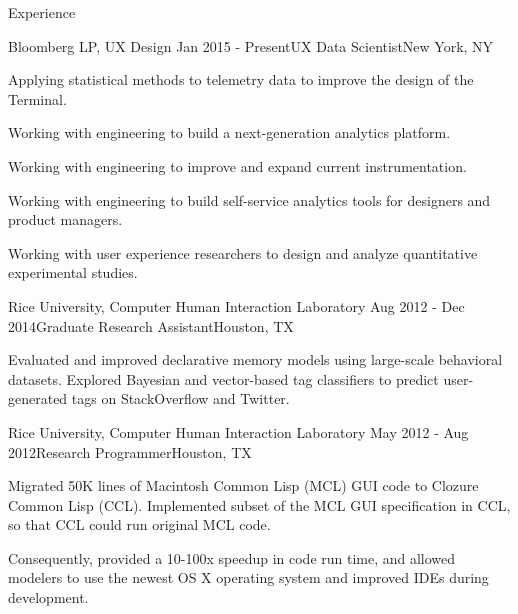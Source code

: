 
\begin{rSection}{Experience}

  \begin{rSubsection}{Bloomberg LP, UX Design}
    {Jan 2015 - Present}{UX Data Scientist}{New York, NY}
  \item Applying statistical methods to telemetry data to improve the design of the Terminal.
  \item Working with engineering to build a next-generation analytics platform.
  \item Working with engineering to improve and expand current instrumentation.
  \item Working with engineering to build self-service analytics tools for designers and product managers.
  \item Working with user experience researchers to design and analyze quantitative experimental studies.
  \end{rSubsection}

  \begin{rSubsection}{Rice University, Computer Human Interaction Laboratory}
    {Aug 2012 - Dec 2014}{Graduate Research Assistant}{Houston, TX}
  \item Evaluated and improved declarative memory models using large-scale behavioral datasets.
    Explored Bayesian and vector-based tag classifiers to predict user-generated tags on StackOverflow and Twitter.
  \end{rSubsection}

  \begin{rSubsection}{Rice University, Computer Human Interaction Laboratory}
    {May 2012 - Aug 2012}{Research Programmer}{Houston, TX}
  \item Migrated 50K lines of Macintosh Common Lisp (MCL) GUI code to Clozure Common Lisp (CCL).
    Implemented subset of the MCL GUI specification in CCL, so that CCL could run original MCL code.
  \item Consequently, provided a 10-100x speedup in code run time, and allowed modelers to use the newest OS X operating system and improved IDEs during development.
  \end{rSubsection}


\end{rSection}
